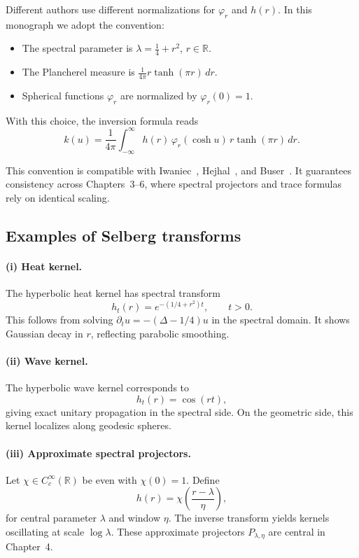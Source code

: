 Different authors use different normalizations for $\varphi_r$ and $h(r)$.
In this monograph we adopt the convention:

\begin{itemize}
  \item The spectral parameter is $\lambda = \tfrac14 + r^2$, $r\in \mathbb{R}$.
  \item The Plancherel measure is $\tfrac{1}{4\pi} r\tanh(\pi r)\,dr$.
  \item Spherical functions $\varphi_r$ are normalized by $\varphi_r(0)=1$.
\end{itemize}

With this choice, the inversion formula reads
\[
  k(u) = \frac{1}{4\pi}\int_{-\infty}^\infty
          h(r)\,\varphi_r(\cosh u)\,r\tanh(\pi r)\,dr.
\]

\begin{remark}
This convention is compatible with Iwaniec~\cite{Iwaniec2002},
Hejhal~\cite{Hejhal1983}, and Buser~\cite{Buser1992}.
It guarantees consistency across Chapters~3–6,
where spectral projectors and trace formulas rely on identical scaling.
\end{remark}

\subsection{Examples of Selberg transforms}

\paragraph{(i) Heat kernel.}
The hyperbolic heat kernel has spectral transform
\[
  h_t(r) = e^{-(1/4+r^2)t}, \qquad t>0.
\]
This follows from solving $\partial_t u = -(\Delta-1/4)u$ in the spectral domain.
It shows Gaussian decay in $r$, reflecting parabolic smoothing.

\paragraph{(ii) Wave kernel.}
The hyperbolic wave kernel corresponds to
\[
  h_t(r) = \cos(rt),
\]
giving exact unitary propagation in the spectral side.
On the geometric side, this kernel localizes along geodesic spheres.

\paragraph{(iii) Approximate spectral projectors.}
Let $\chi\in C_c^\infty(\mathbb{R})$ be even with $\chi(0)=1$.
Define
\[
  h(r) = \chi\!\left(\frac{r-\lambda}{\eta}\right),
\]
for central parameter $\lambda$ and window $\eta$.
The inverse transform yields kernels oscillating at scale $\log \lambda$.
These approximate projectors $P_{\lambda,\eta}$ are central in Chapter~4.

